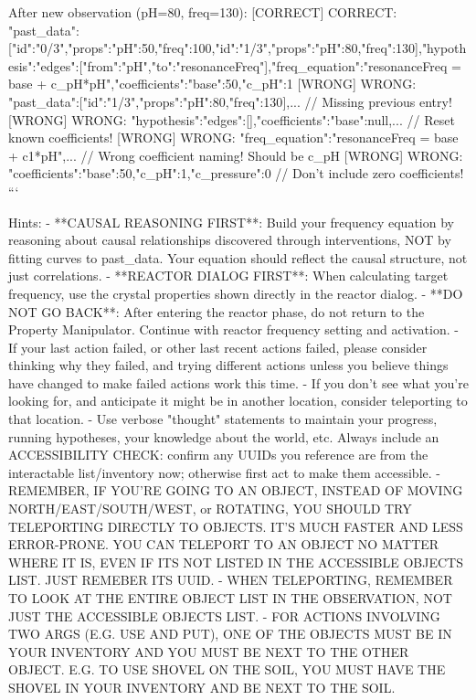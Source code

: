 \begin{tcblisting}
After new observation (pH=80, freq=130):
[CORRECT] CORRECT: {"past_data":[{"id":"0/3","props":{"pH":50},"freq":100},{"id":"1/3","props":{"pH":80},"freq":130}],"hypothesis":{"edges":[{"from":"pH","to":"resonanceFreq"}],"freq_equation":"resonanceFreq = base + c_pH*pH","coefficients":{"base":50,"c_pH":1}}}
[WRONG] WRONG: {"past_data":[{"id":"1/3","props":{"pH":80},"freq":130}],...}  // Missing previous entry!
[WRONG] WRONG: {"hypothesis":{"edges":[],"coefficients":{"base":null,...}}}  // Reset known coefficients!
[WRONG] WRONG: {"freq_equation":"resonanceFreq = base + c1*pH",...}  // Wrong coefficient naming! Should be c_pH
[WRONG] WRONG: {"coefficients":{"base":50,"c_pH":1,"c_pressure":0}}  // Don't include zero coefficients!
```

Hints:
- **CAUSAL REASONING FIRST**: Build your frequency equation by reasoning about causal relationships discovered through interventions, NOT by fitting curves to past_data. Your equation should reflect the causal structure, not just correlations.
- **REACTOR DIALOG FIRST**: When calculating target frequency, use the crystal properties shown directly in the reactor dialog.
- **DO NOT GO BACK**: After entering the reactor phase, do not return to the Property Manipulator. Continue with reactor frequency setting and activation.
- If your last action failed, or other last recent actions failed, please consider thinking why they failed, and trying different actions unless you believe things have changed to make failed actions work this time.
- If you don't see what you're looking for, and anticipate it might be in another location, consider teleporting to that location.
- Use verbose "thought" statements to maintain your progress, running hypotheses, your knowledge about the world, etc. Always include an ACCESSIBILITY CHECK: confirm any UUIDs you reference are from the interactable list/inventory now; otherwise first act to make them accessible.
- REMEMBER, IF YOU'RE GOING TO AN OBJECT, INSTEAD OF MOVING NORTH/EAST/SOUTH/WEST, or ROTATING, YOU SHOULD TRY TELEPORTING DIRECTLY TO OBJECTS.  IT'S MUCH FASTER AND LESS ERROR-PRONE. YOU CAN TELEPORT TO AN OBJECT NO MATTER WHERE IT IS, EVEN IF ITS NOT LISTED IN THE ACCESSIBLE OBJECTS LIST. JUST REMEBER ITS UUID.
- WHEN TELEPORTING, REMEMBER TO LOOK AT THE ENTIRE OBJECT LIST IN THE OBSERVATION, NOT JUST THE ACCESSIBLE OBJECTS LIST.
- FOR ACTIONS INVOLVING TWO ARGS (E.G. USE AND PUT), ONE OF THE OBJECTS MUST BE IN YOUR INVENTORY AND YOU MUST BE NEXT TO THE OTHER OBJECT. E.G. TO USE SHOVEL ON THE SOIL, YOU MUST HAVE THE SHOVEL IN YOUR INVENTORY AND BE NEXT TO THE SOIL.

\end{tcblisting}
